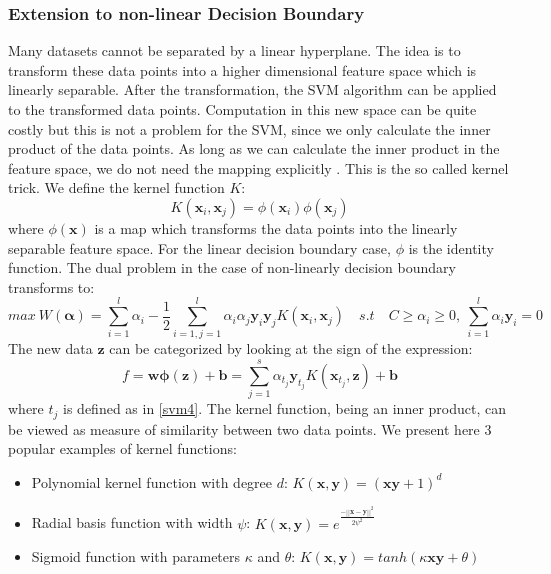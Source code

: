 \documentclass[a4paper,11pt,oneside]{article}
\begin{document}
\subsubsection*{Extension to non-linear Decision Boundary}
Many datasets cannot be separated by a linear hyperplane. The idea is to transform these data points
into a higher dimensional feature space which is linearly separable. After the transformation, the SVM algorithm can be applied to the transformed data points.
Computation in this new space can be quite costly but this is not a problem for the SVM, since we only calculate the inner product 
of the data points. As long as we can calculate the inner product in the feature space, we do not need the mapping explicitly \cite{law2006simple}.
This is the so called kernel trick. We define the kernel function $K$:
\begin{equation}
  K(\mathbf{x}_i,\mathbf{x}_j) = \phi(\mathbf{x}_i)\phi(\mathbf{x}_j)
\end{equation} where $\phi(\mathbf{x})$ is a map which transforms the data points into the linearly separable feature space.
For the linear decision boundary case, $\phi$ is the identity function. The dual problem in the case of non-linearly decision boundary
transforms to:
\begin{equation}\label{svm5}
  max \ W(\mathbf{\alpha}) = \sum_{i=1}^l \alpha_i - \frac{1}{2} \sum_{i=1,j=1}^l \alpha_i \alpha_j \mathbf{y}_i\mathbf{y}_jK(\mathbf{x}_i,\mathbf{x}_j)
  \quad s.t \quad C\geq\alpha_i \geq 0,\ \sum_{i=1}^l \alpha_i\mathbf{y}_i = 0
\end{equation}
The new data $\mathbf{z}$ can be categorized by looking at the sign of the expression:
\begin{equation}\label{svm6}
  f = \mathbf{w}\mathbf{\phi(z)}+\mathbf{b} = \sum_{j=1}^s \alpha_{t_j}\mathbf{y}_{t_j}K(\mathbf{x}_{t_j},\mathbf{z})+\mathbf{b} 
\end{equation} where $t_j$ is defined as in \ref{svm4}.
The kernel function, being an inner product, can be viewed as measure of similarity between two data points.
We present here 3 popular examples of kernel functions:
\begin{itemize}
  \item Polynomial kernel function with degree $d$:
  \begin{math}
    K(\mathbf{x},\mathbf{y}) = (\mathbf{x}\mathbf{y} + 1)^d
  \end{math}
  \item Radial basis function with width $\psi$:
  \begin{math}
    K(\mathbf{x},\mathbf{y}) = e^{\frac{-||\mathbf{x}-\mathbf{y}||^2}{2\psi^2}}
  \end{math}
  \item Sigmoid function with parameters $\kappa$ and $\theta$: 
  \begin{math}
    K(\mathbf{x},\mathbf{y}) = tanh(\kappa \mathbf{x} \mathbf{y}+\theta)
  \end{math}
\end{itemize}
\end{document}
